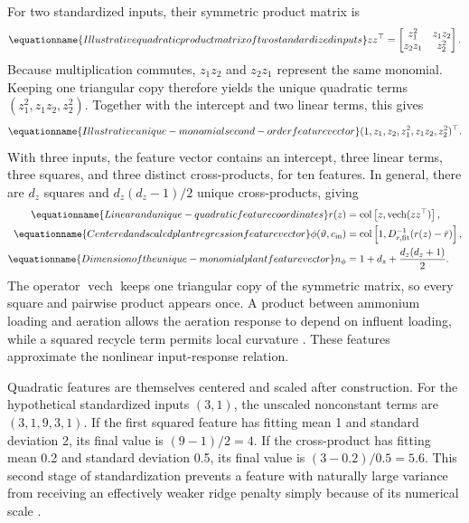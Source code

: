 For two standardized inputs, their symmetric product matrix is
\begin{equation}
\equationname{Illustrative quadratic product matrix of two standardized inputs}
zz^\top=\begin{bmatrix}z_1^2&z_1z_2\\z_2z_1&z_2^2\end{bmatrix}.
\end{equation}
Because multiplication commutes, $z_1z_2$ and $z_2z_1$ represent the same monomial. Keeping one triangular copy therefore yields the unique quadratic terms $(z_1^2,z_1z_2,z_2^2)$. Together with the intercept and two linear terms, this gives
\begin{equation}
\equationname{Illustrative unique-monomial second-order feature vector}
(1,z_1,z_2,z_1^2,z_1z_2,z_2^2)^\top.
\end{equation}
With three inputs, the feature vector contains an intercept, three linear terms, three squares, and three distinct cross-products, for ten features. In general, there are $d_z$ squares and $d_z(d_z-1)/2$ unique cross-products, giving
\begin{align}
\equationname{Linear and unique-quadratic feature coordinates}
r(z)&=\operatorname{col}\left[z,\operatorname{vech}(zz^\top)\right],\\
\equationname{Centered and scaled plant regression feature vector}
\phi(\vartheta,c_{\rm in})&=\operatorname{col}\left[1,D_{r,\rm fit}^{-1}(r(z)-\bar r)\right],\\
\equationname{Dimension of the unique-monomial plant feature vector}
n_\phi&=1+d_z+\frac{d_z(d_z+1)}{2}.
\label{eq:plant_features}
\end{align}
The operator $\operatorname{vech}$ keeps one triangular copy of the symmetric matrix, so every square and pairwise product appears once. A product between ammonium loading and aeration allows the aeration response to depend on influent loading, while a squared recycle term permits local curvature \citep{Nazlabadi2021,Selerio2026}. These features approximate the nonlinear input-response relation.

Quadratic features are themselves centered and scaled after construction. For the hypothetical standardized inputs $(3,1)$, the unscaled nonconstant terms are $(3,1,9,3,1)$. If the first squared feature has fitting mean 1 and standard deviation 2, its final value is $(9-1)/2=4$. If the cross-product has fitting mean 0.2 and standard deviation 0.5, its final value is $(3-0.2)/0.5=5.6$. This second stage of standardization prevents a feature with naturally large variance from receiving an effectively weaker ridge penalty simply because of its numerical scale \citep{Hastie2009}.


